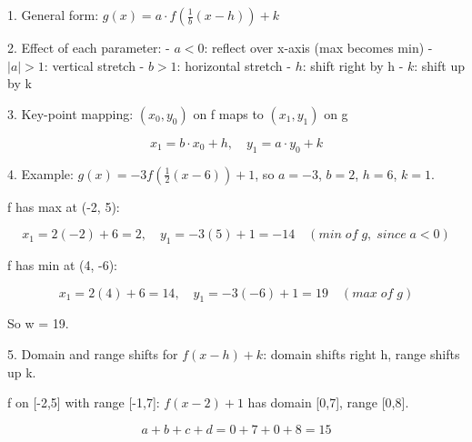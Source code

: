 1. General form: $g(x) = a \cdot f\!\left(\frac{1}{b}(x-h)\right) + k$

2. Effect of each parameter:
- $a < 0$: reflect over x-axis (max becomes min)
- $|a| > 1$: vertical stretch
- $b > 1$: horizontal stretch
- $h$: shift right by h
- $k$: shift up by k

3. Key-point mapping: $(x_0, y_0)$ on f maps to $(x_1, y_1)$ on g

$$ x_1 = b \cdot x_0 + h, \quad y_1 = a \cdot y_0 + k $$

4. Example: $g(x) = -3f\!\left(\frac{1}{2}(x-6)\right) + 1$, so $a=-3$, $b=2$, $h=6$, $k=1$.

f has max at (-2, 5):

$$ x_1 = 2(-2)+6 = 2, \quad y_1 = -3(5)+1 = -14 \quad (min \; of \; g, \; since \; a<0) $$

f has min at (4, -6):

$$ x_1 = 2(4)+6 = 14, \quad y_1 = -3(-6)+1 = 19 \quad (max \; of \; g) $$

So w = 19.

5. Domain and range shifts for $f(x - h) + k$: domain shifts right h, range shifts up k.

f on [-2,5] with range [-1,7]: $f(x-2)+1$ has domain [0,7], range [0,8].

$$ a+b+c+d = 0+7+0+8 = 15 $$
